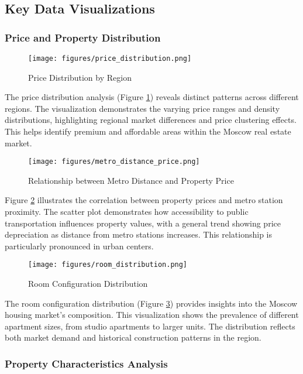 \documentclass[12pt,a4paper]{report}
\begin{document}
\subsection{Key Data Visualizations}
\subsubsection{Price and Property Distribution}

\begin{figure}[H]
\centering
\texttt{[image: figures/price\_distribution.png]}
\caption{Price Distribution by Region}
\label{fig:price_dist}
\end{figure}
The price distribution analysis (Figure \ref{fig:price_dist}) reveals distinct patterns across different regions. The visualization demonstrates the varying price ranges and density distributions, highlighting regional market differences and price clustering effects. This helps identify premium and affordable areas within the Moscow real estate market.


\begin{figure}[H]
\centering
\texttt{[image: figures/metro\_distance\_price.png]}
\caption{Relationship between Metro Distance and Property Price}
\label{fig:metro_price}
\end{figure}
Figure \ref{fig:metro_price} illustrates the correlation between property prices and metro station proximity. The scatter plot demonstrates how accessibility to public transportation influences property values, with a general trend showing price depreciation as distance from metro stations increases. This relationship is particularly pronounced in urban centers.
\begin{figure}[H]
\centering
\texttt{[image: figures/room\_distribution.png]}
\caption{Room Configuration Distribution}
\label{fig:room_dist}
\end{figure}
The room configuration distribution (Figure \ref{fig:room_dist}) provides insights into the Moscow housing market's composition. This visualization shows the prevalence of different apartment sizes, from studio apartments to larger units. The distribution reflects both market demand and historical construction patterns in the region.
\subsubsection{Property Characteristics Analysis}
\end{document}
